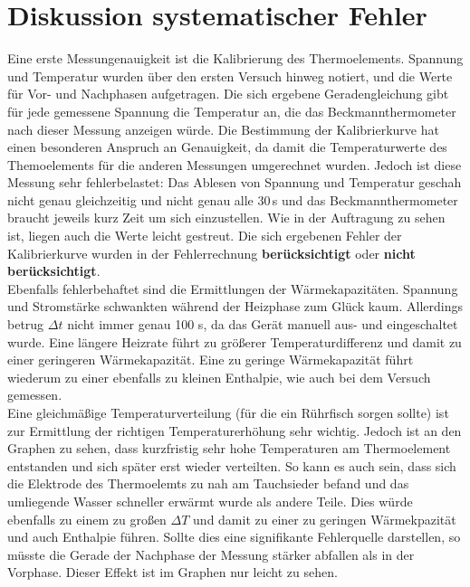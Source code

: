 \documentclass[12pt,a4paper,titlepage,headinclude,bibtotoc]{scrartcl}
\begin{document}
\section{Diskussion systematischer Fehler}
Eine erste Messungenauigkeit ist die Kalibrierung des Thermoelements. Spannung und Temperatur wurden über den ersten Versuch hinweg notiert, und die Werte für Vor- und Nachphasen aufgetragen. Die sich ergebene Geradengleichung gibt für jede gemessene Spannung die Temperatur an, die das Beckmannthermometer nach dieser Messung anzeigen würde. Die Bestimmung der Kalibrierkurve hat einen besonderen Anspruch an Genauigkeit, da damit die Temperaturwerte des Themoelements für die anderen Messungen umgerechnet wurden. Jedoch ist diese Messung sehr fehlerbelastet: Das Ablesen von Spannung und Temperatur geschah nicht genau gleichzeitig und nicht genau alle 30\,s und das Beckmannthermometer braucht jeweils kurz Zeit um sich einzustellen. Wie in der Auftragung zu sehen ist, liegen auch die Werte leicht gestreut. Die sich ergebenen Fehler der Kalibrierkurve wurden in der Fehlerrechnung \textbf{berücksichtigt} oder \textbf{nicht berücksichtigt}.\\

Ebenfalls fehlerbehaftet sind die Ermittlungen der Wärmekapazitäten. Spannung und Stromstärke schwankten während der Heizphase zum Glück kaum. Allerdings betrug $\Delta t$ nicht immer genau 100 s, da das Gerät manuell aus- und eingeschaltet wurde. Eine längere Heizrate führt zu größerer Temperaturdifferenz und damit zu einer geringeren Wärmekapazität. Eine zu geringe Wärmekapazität führt wiederum zu einer ebenfalls zu kleinen Enthalpie, wie auch bei dem Versuch gemessen.\\

Eine gleichmäßige Temperaturverteilung (für die ein Rührfisch sorgen sollte) ist zur Ermittlung der richtigen Temperaturerhöhung sehr wichtig. Jedoch ist an den Graphen zu sehen, dass kurzfristig sehr hohe Temperaturen am Thermoelement entstanden und sich später erst wieder verteilten. So kann es auch sein, dass sich die Elektrode des Thermoelemts zu nah am Tauchsieder befand und das umliegende Wasser schneller erwärmt wurde als andere Teile. Dies würde ebenfalls zu einem zu großen $\Delta T$ und damit zu einer zu geringen Wärmekpazität und auch Enthalpie führen. Sollte dies eine signifikante Fehlerquelle darstellen, so müsste die Gerade der Nachphase der Messung stärker abfallen als in der Vorphase. Dieser Effekt ist im Graphen nur leicht zu sehen.\\
\end{document}
